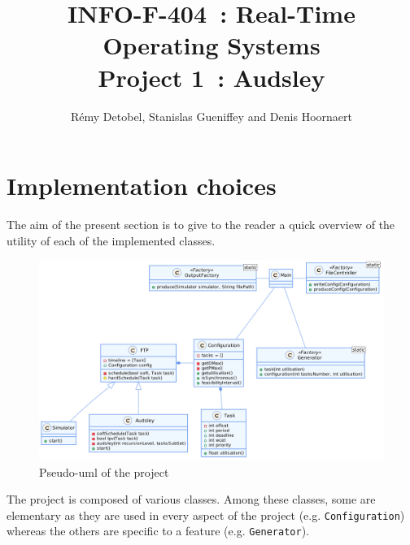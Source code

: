 \documentclass[a4paper,11pt]{article}
\title{INFO-F-404~: Real-Time Operating Systems\\Project 1~: Audsley}
\author{Rémy Detobel, Stanislas Gueniffey and Denis Hoornaert}
\begin{document}
\maketitle

\section{Implementation choices}
  The aim of the present section is to give to the reader a quick overview of the utility of each of the implemented classes.\\
  
  \begin{figure}[ht!]
    \centering
    \includegraphics[scale=0.175]{img/uml.png}
    \caption{Pseudo-uml of the project}
    \label{fig:pseudo-uml}
  \end{figure}
  \noindent The project is composed of various classes. Among these classes, some are elementary as they are used in every aspect of the project (e.g. \verb|Configuration|) whereas the others are specific to a feature (e.g. \verb|Generator|).\\
  
\end{document}
